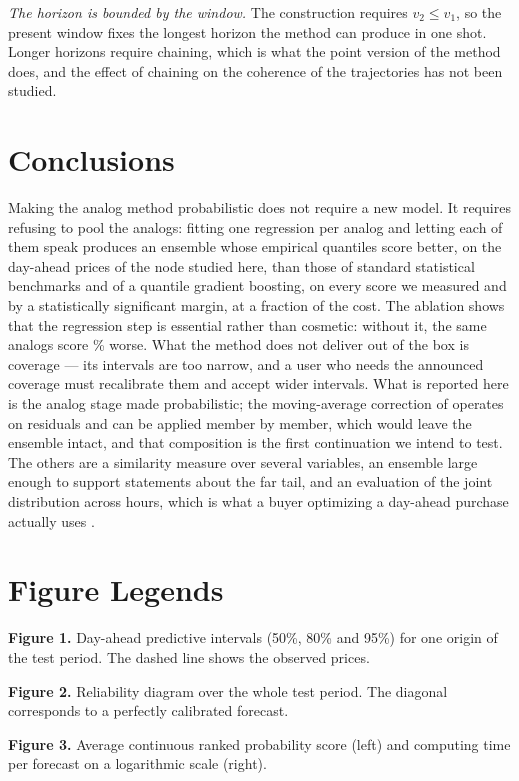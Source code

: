 \documentclass[12pt,a4paper]{article}
\begin{document}
\textit{The horizon is bounded by the window.} The construction requires
$v_2\le v_1$, so the present window fixes the longest horizon the method can
produce in one shot. Longer horizons require chaining, which is what the point
version of the method does, and the effect of chaining on the coherence of the
trajectories has not been studied.

\section{Conclusions}
\label{sec:conclusions}

Making the analog method probabilistic does not require a new model. It
requires refusing to pool the analogs: fitting one regression per analog and
letting each of them speak produces an ensemble whose empirical quantiles
score better, on the day-ahead prices of the node studied here, than those of
standard statistical benchmarks and of a quantile gradient boosting, on every
score we measured and by a statistically significant margin, at a fraction of
the cost. The ablation shows that the regression step is essential rather than
cosmetic: without it, the same analogs score \CRPSGAINRAW\% worse. What the
method does not deliver out of the box is coverage — its intervals are too
narrow, and a user who needs the announced coverage must recalibrate them and
accept wider intervals. What is reported here is the analog stage made
probabilistic; the moving-average correction of \citet{LezamaLope2023} operates
on residuals and can be applied member by member, which would leave the
ensemble intact, and that composition is the first continuation we intend to
test. The others are a similarity measure over several variables, an ensemble
large enough to support statements about the far tail, and an evaluation of
the joint distribution across hours, which is what a buyer optimizing a
day-ahead purchase actually uses \citep{Rockafellar2000}.

\section*{Figure Legends}

\noindent\textbf{Figure 1.} Day-ahead predictive intervals (50\%, 80\% and
95\%) for one origin of the test period. The dashed line shows the observed
prices.

\noindent\textbf{Figure 2.} Reliability diagram over the whole test period.
The diagonal corresponds to a perfectly calibrated forecast.

\noindent\textbf{Figure 3.} Average continuous ranked probability score (left)
and computing time per forecast on a logarithmic scale (right).



\end{document}
